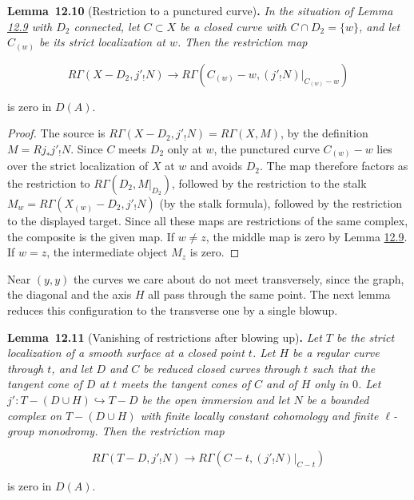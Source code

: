 \documentclass[11pt]{article}
\newenvironment{bpstatement}[2]{\par\addvspace{0.6\baselineskip}\noindent\textbf{#1}#2\textbf{.}\enspace\ignorespaces}
  {\par\addvspace{0.4\baselineskip}}
\newenvironment{bpstatementit}[2]{\begin{bpstatement}{#1}{#2}\itshape\ignorespaces}{\end{bpstatement}}
\begin{document}
\label{bp31}%
\begin{bpstatementit}{Lemma~12.10}{ (Restriction to a punctured curve)}
In the situation of Lemma \hyperref[bp28]{12.9} with \(D_2\) connected, let \(C\subset X\) be a closed curve with \(C\cap D_2=\{w\}\), and let \(C_{(w)}\) be its strict localization at \(w\). Then the restriction map

\[
R\Gamma(X-D_2,j'_!N)\longrightarrow
R\Gamma(C_{(w)}-w,(j'_!N)|_{C_{(w)}-w})
\]

is zero in \(D(A)\).
\end{bpstatementit}

\begin{proof}[{Proof}]\label{bp32}%
The source is \(R\Gamma(X-D_2,j'_!N)=R\Gamma(X,M)\), by the definition \(M=Rj_*j'_!N\). Since \(C\) meets \(D_2\) only at \(w\), the punctured curve \(C_{(w)}-w\) lies over the strict localization of \(X\) at \(w\) and avoids \(D_2\). The map therefore factors as the restriction to \(R\Gamma(D_2,M|_{D_2})\), followed by the restriction to the stalk \(M_w=R\Gamma(X_{(w)}-D_2,j'_!N)\) (by the stalk formula), followed by the restriction to the displayed target. Since all these maps are restrictions of the same complex, the composite is the given map. If \(w\ne z\), the middle map is zero by Lemma \hyperref[bp28]{12.9}. If \(w=z\), the intermediate object \(M_z\) is zero.
\end{proof}

\label{bp33}%
Near \((y,y)\) the curves we care about do not meet transversely, since the graph, the diagonal and the axis \(H\) all pass through the same point. The next lemma reduces this configuration to the transverse one by a single blowup.

\label{bp34}%
\begin{bpstatementit}{Lemma~12.11}{ (Vanishing of restrictions after blowing up)}
Let \(T\) be the strict localization of a smooth surface at a closed point \(t\). Let \(H\) be a regular curve through \(t\), and let \(D\) and \(C\) be reduced closed curves through \(t\) such that the tangent cone of \(D\) at \(t\) meets the tangent cones of \(C\) and of \(H\) only in \(0\). Let \(j':T-(D\cup H)\hookrightarrow T-D\) be the open immersion and let \(N\) be a bounded complex on \(T-(D\cup H)\) with finite locally constant cohomology and finite \(\ell\)-group monodromy. Then the restriction map

\[
R\Gamma(T-D,j'_!N)\longrightarrow
R\Gamma(C-t,(j'_!N)|_{C-t})
\]

is zero in \(D(A)\).
\end{bpstatementit}
\end{document}
